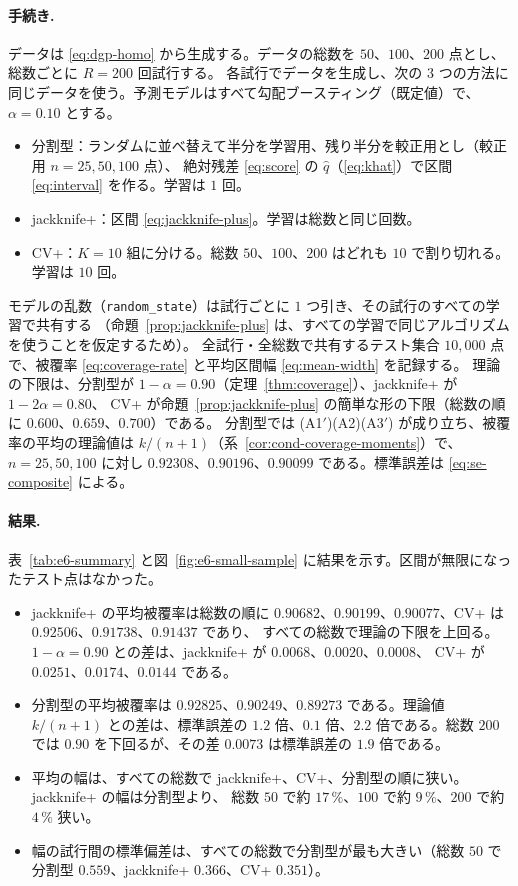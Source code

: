 \documentclass[a4paper,11pt]{jsarticle}
\theoremstyle{definition}
\theoremstyle{plain}
\theoremstyle{remark}
\newcommand{\qhat}{\hat{q}}
\begin{document}
\paragraph{手続き.}
データは \eqref{eq:dgp-homo} から生成する。データの総数を $50$、$100$、$200$ 点とし、総数ごとに $R=200$ 回試行する。
各試行でデータを生成し、次の $3$ つの方法に同じデータを使う。予測モデルはすべて勾配ブースティング（既定値）で、$\alpha=0.10$ とする。
\begin{itemize}
  \item 分割型：ランダムに並べ替えて半分を学習用、残り半分を較正用とし（較正用 $n=25,50,100$ 点）、
    絶対残差 \eqref{eq:score} の $\qhat$（\eqref{eq:khat}）で区間 \eqref{eq:interval} を作る。学習は $1$ 回。
  \item jackknife+：区間 \eqref{eq:jackknife-plus}。学習は総数と同じ回数。
  \item CV+：$K=10$ 組に分ける。総数 $50$、$100$、$200$ はどれも $10$ で割り切れる。学習は $10$ 回。
\end{itemize}
モデルの乱数（\texttt{random\_state}）は試行ごとに $1$ つ引き、その試行のすべての学習で共有する
（命題~\ref{prop:jackknife-plus} は、すべての学習で同じアルゴリズムを使うことを仮定するため）。
全試行・全総数で共有するテスト集合 $10{,}000$ 点で、被覆率 \eqref{eq:coverage-rate} と平均区間幅 \eqref{eq:mean-width} を記録する。
理論の下限は、分割型が $1-\alpha=0.90$（定理~\ref{thm:coverage}）、jackknife+ が $1-2\alpha=0.80$、
CV+ が命題~\ref{prop:jackknife-plus} の簡単な形の下限（総数の順に $0.600$、$0.659$、$0.700$）である。
分割型では (A1$'$)(A2)(A3$'$) が成り立ち、被覆率の平均の理論値は $k/(n+1)$（系~\ref{cor:cond-coverage-moments}）で、
$n=25,50,100$ に対し $0.92308$、$0.90196$、$0.90099$ である。標準誤差は \eqref{eq:se-composite} による。

\paragraph{結果.}
表~\ref{tab:e6-summary} と図~\ref{fig:e6-small-sample} に結果を示す。区間が無限になったテスト点はなかった。
\begin{itemize}
  \item jackknife+ の平均被覆率は総数の順に $0.90682$、$0.90199$、$0.90077$、CV+ は $0.92506$、$0.91738$、$0.91437$ であり、
    すべての総数で理論の下限を上回る。$1-\alpha=0.90$ との差は、jackknife+ が $0.0068$、$0.0020$、$0.0008$、
    CV+ が $0.0251$、$0.0174$、$0.0144$ である。
  \item 分割型の平均被覆率は $0.92825$、$0.90249$、$0.89273$ である。理論値 $k/(n+1)$ との差は、標準誤差の
    $1.2$ 倍、$0.1$ 倍、$2.2$ 倍である。総数 $200$ では $0.90$ を下回るが、その差 $0.0073$ は標準誤差の $1.9$ 倍である。
  \item 平均の幅は、すべての総数で jackknife+、CV+、分割型の順に狭い。jackknife+ の幅は分割型より、
    総数 $50$ で約 $17\,\%$、$100$ で約 $9\,\%$、$200$ で約 $4\,\%$ 狭い。
  \item 幅の試行間の標準偏差は、すべての総数で分割型が最も大きい（総数 $50$ で分割型 $0.559$、jackknife+ $0.366$、CV+ $0.351$）。
\end{itemize}
\end{document}
